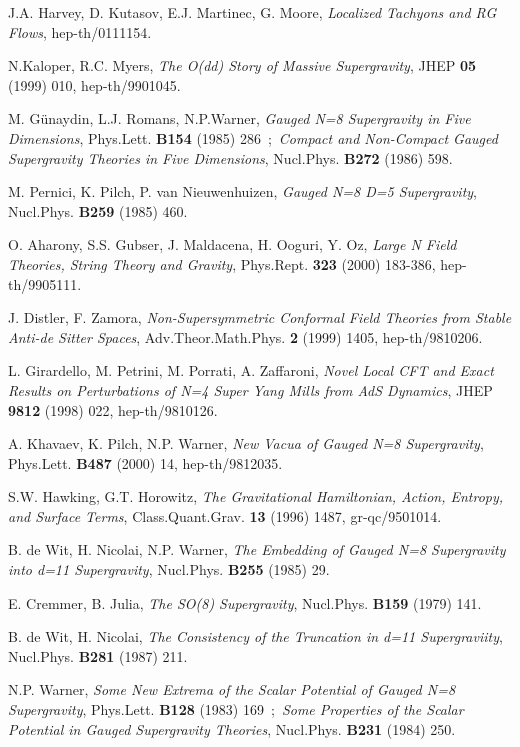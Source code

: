 \documentclass[a4paper,a4paper]{article}
\begin{document}
\begin{thebibliography}{99}
J.A. Harvey, D. Kutasov, E.J. Martinec, G. Moore, 
{\it Localized Tachyons and RG Flows}, 
hep-th/0111154. 

N.Kaloper, R.C. Myers, 
{\it The O(dd) Story of Massive Supergravity}, 
JHEP {\bf 05} (1999) 010, hep-th/9901045. 

M. G\"unaydin, L.J. Romans, N.P.Warner, 
{\it Gauged N=8 Supergravity in Five Dimensions}, 
Phys.Lett. {\bf B154} (1985) 286\ ;\ 
{\it Compact and Non-Compact Gauged Supergravity Theories in Five Dimensions}, 
Nucl.Phys. {\bf B272} (1986) 598.

M. Pernici, K. Pilch, P. van Nieuwenhuizen, 
{\it Gauged N=8 D=5 Supergravity}, 
Nucl.Phys. {\bf B259} (1985) 460.

O. Aharony, S.S. Gubser, J. Maldacena, H. Ooguri, Y. Oz, 
{\it Large N Field Theories, String Theory and Gravity}, 
Phys.Rept. {\bf 323} (2000) 183-386, hep-th/9905111. 

J. Distler, F. Zamora, 
{\it Non-Supersymmetric Conformal Field Theories from Stable Anti-de Sitter Spaces}, 
Adv.Theor.Math.Phys. {\bf 2} (1999) 1405, hep-th/9810206. 

L. Girardello, M. Petrini, M. Porrati, A. Zaffaroni, 
{\it Novel Local CFT and Exact Results on Perturbations of N=4 Super Yang Mills from AdS Dynamics}, 
JHEP {\bf 9812} (1998) 022, hep-th/9810126. 

A. Khavaev, K. Pilch, N.P. Warner, 
{\it New Vacua of Gauged N=8 Supergravity}, 
Phys.Lett. {\bf B487} (2000) 14, hep-th/9812035. 

S.W. Hawking, G.T. Horowitz, 
{\it The Gravitational Hamiltonian, Action, Entropy, and Surface Terms}, 
Class.Quant.Grav. {\bf 13} (1996) 1487, gr-qc/9501014. 

B. de Wit, H. Nicolai, N.P. Warner, 
{\it The Embedding of Gauged N=8 Supergravity into d=11 Supergravity}, 
Nucl.Phys. {\bf B255} (1985) 29. 

E. Cremmer, B. Julia, 
{\it The SO(8) Supergravity}, 
Nucl.Phys. {\bf B159} (1979) 141. 

B. de Wit, H. Nicolai, 
{\it The Consistency of the \coordHE{} Truncation in d=11 Supergraviity}, 
Nucl.Phys. {\bf B281} (1987) 211.

N.P. Warner, 
{\it Some New Extrema of the Scalar Potential of Gauged N=8 Supergravity}, 
Phys.Lett. {\bf B128} (1983) 169\ ;\ 
{\it Some Properties of the Scalar Potential in Gauged Supergravity Theories}, 
Nucl.Phys. {\bf B231} (1984) 250.


\end{thebibliography}
\end{document}
